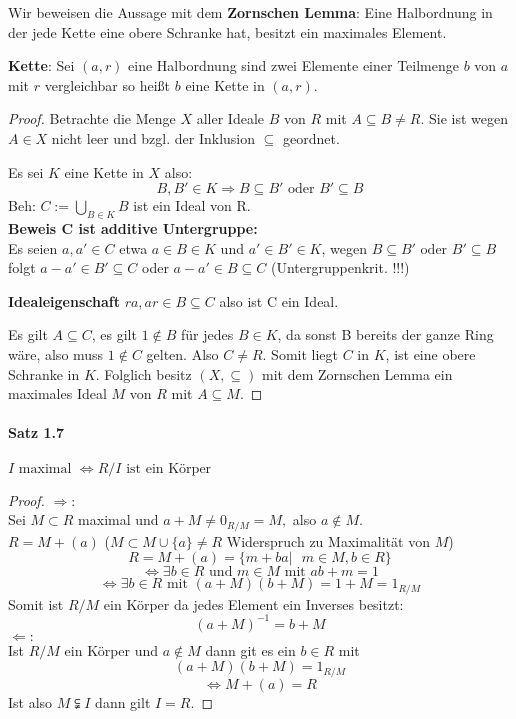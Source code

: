 \documentclass[a4paper]{article}
\begin{document}
Wir beweisen die Aussage mit dem \textbf{Zornschen Lemma}: Eine Halbordnung in der jede Kette eine obere Schranke hat, besitzt ein maximales Element. 
\smallskip

\textbf{Kette}: Sei $ (a,r) $ eine Halbordnung sind zwei Elemente einer Teilmenge $ b $ von $ a $ mit $ r $ vergleichbar 
so heißt $ b $ eine Kette in $ (a,r) $.

\begin{proof}
      Betrachte die Menge $ X $ aller Ideale $ B $ von $ R $ mit $ A \subseteq B \neq R $. 
      Sie ist wegen $ A \in X $ nicht leer und bzgl. der Inklusion $ \subseteq $ geordnet.

      \bigskip
      Es sei $ K $ eine Kette in $ X $ also:
      $$ B, B' \in K \Rightarrow B \subseteq B' \text{ oder } B' \subseteq B $$ 
      Beh: $ C := \bigcup_{B \in K} B $ ist ein Ideal von R. \\

      \textbf{Beweis C ist additive Untergruppe:} \\
      Es seien $ a, a' \in C $ etwa $ a \in B \in K $ und $ a' \in B' \in K $, wegen 
      $ B \subseteq B' \text{ oder } B' \subseteq B $ folgt $ a - a' \in B' \subseteq C $
      oder $ a - a' \in B \subseteq C $  (Untergruppenkrit. !!!)
     
      \bigskip
      \textbf{Idealeigenschaft} 
      $ r a, a r \in B \subseteq C $ also ist C ein Ideal.

      \bigskip
      Es gilt $ A \subseteq C $, es gilt $ 1 \notin B $ für jedes $ B \in K $, da sonst B bereits der ganze Ring wäre, also 
      muss $ 1 \notin C $ gelten. Also $ C \neq R $. Somit liegt $ C $ in $ K $, ist eine obere Schranke in $ K $.
      Folglich besitz $ (X,\subseteq) $ mit dem Zornschen Lemma ein maximales Ideal $ M $ von $ R $ mit $ A \subseteq M $.
\end{proof}



\paragraph{Satz 1.7} $ I \text{ maximal } \iff R/I  \text{ ist ein Körper} $
\begin{proof}
      $\Rightarrow:$  \\
      Sei $ M \subset R $ maximal und $ a + M \neq 0_{R/M} = M, $ also $ a \notin M$. \\
      $ R = M + (a) $ ($ M \subset M \cup \{a\} \neq R $ Widerspruch zu Maximalität von $ M $) \\
      $$ R = M + (a) = \{m + ba | \text{ } m \in M, b \in R\} $$
      $$ \iff \exists b \in R \text{ und } m \in M \text{ mit } ab + m = 1$$ 
      $$ \iff  \exists b \in R \text{ mit } (a + M)(b + M) = 1 + M = 1_{R/M}$$ 
      Somit ist $ R/M $ ein Körper da jedes Element ein Inverses besitzt:
      $$ (a + M)^{-1} = b + M $$
      $\Leftarrow:$ \\
      Ist $ R/M $ ein Körper und $ a \notin M $ dann git es ein $ b \in R $ mit 
      $$ (a + M)(b + M) = 1_{R/M} $$
      $$ \iff M + (a) = R $$  
      Ist also $ M \subsetneqq I $ dann gilt $ I = R $. 
\end{proof}
\end{document}
